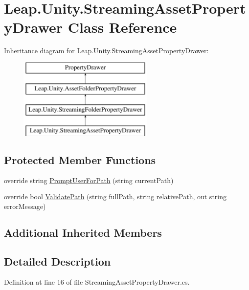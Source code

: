 \hypertarget{class_leap_1_1_unity_1_1_streaming_asset_property_drawer}{}\section{Leap.\+Unity.\+Streaming\+Asset\+Property\+Drawer Class Reference}
\label{class_leap_1_1_unity_1_1_streaming_asset_property_drawer}
Inheritance diagram for Leap.\+Unity.\+Streaming\+Asset\+Property\+Drawer\+:\begin{figure}[H]
\begin{center}
\leavevmode
\includegraphics[height=4.000000cm]{class_leap_1_1_unity_1_1_streaming_asset_property_drawer}
\end{center}
\end{figure}
\subsection*{Protected Member Functions}
\begin{DoxyCompactItemize}
\item 
override string \mbox{\hyperlink{class_leap_1_1_unity_1_1_streaming_asset_property_drawer_a47389f0e29b9aae610112e71a900b3c1}{Prompt\+User\+For\+Path}} (string current\+Path)
\item 
override bool \mbox{\hyperlink{class_leap_1_1_unity_1_1_streaming_asset_property_drawer_aae138f9f79b66b7da1943b14524d795f}{Validate\+Path}} (string full\+Path, string relative\+Path, out string error\+Message)
\end{DoxyCompactItemize}
\subsection*{Additional Inherited Members}


\subsection{Detailed Description}


Definition at line 16 of file Streaming\+Asset\+Property\+Drawer.\+cs.




